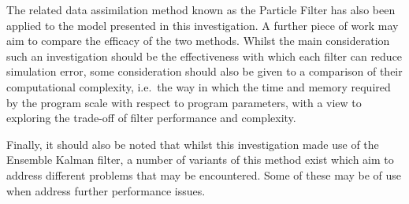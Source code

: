 
The related data assimilation method known as the Particle Filter has also been
applied to the model presented in this investigation.
A further piece of work may aim to compare the efficacy of the two methods.
Whilst the main consideration such an investigation should be the effectiveness
with which each filter can reduce simulation error, some consideration should
also be given to a comparison of their computational complexity, i.e.\ the way
in which the time and memory required by the program scale with respect to
program parameters, with a view to exploring the trade-off of filter performance
and complexity.

Finally, it should also be noted that whilst this investigation made use of the
Ensemble Kalman filter, a number of variants of this method exist
\citep{keller2018comparing, katzfuss2016understanding} which aim to address
different problems that may be encountered.
Some of these may be of use when address further performance issues.

